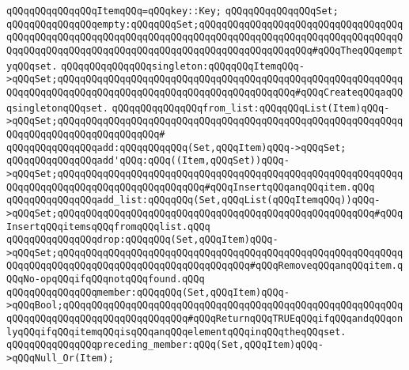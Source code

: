 \newline
\verb|qQQqqQQqqQQqqQQqItemqQQq=qQQqkey::Key;|\newline
\verb|qQQqqQQqqQQqqQQqSet;|\newline
\newline
\verb|qQQqqQQqqQQqqQQqempty:qQQqqQQqSet;qQQqqQQqqQQqqQQqqQQqqQQqqQQqqQQqqQQqqQQqqQQqqQQqqQQqqQQqqQQqqQQqqQQqqQQqqQQqqQQqqQQqqQQqqQQqqQQqqQQqqQQqqQQqqQQqqQQqqQQqqQQqqQQqqQQqqQQqqQQqqQQqqQQqqQQqqQQqqQQq#qQQqTheqQQqemptyqQQqset.|\newline
\newline
\verb|qQQqqQQqqQQqqQQqsingleton:qQQqqQQqItemqQQq->qQQqSet;qQQqqQQqqQQqqQQqqQQqqQQqqQQqqQQqqQQqqQQqqQQqqQQqqQQqqQQqqQQqqQQqqQQqqQQqqQQqqQQqqQQqqQQqqQQqqQQqqQQqqQQqqQQqqQQq#qQQqCreateqQQqaqQQqsingletonqQQqset.|\newline
\newline
\verb|qQQqqQQqqQQqqQQqfrom_list:qQQqqQQqList(Item)qQQq->qQQqSet;qQQqqQQqqQQqqQQqqQQqqQQqqQQqqQQqqQQqqQQqqQQqqQQqqQQqqQQqqQQqqQQqqQQqqQQqqQQqqQQqqQQqqQQq#|\newline
\newline
\verb|qQQqqQQqqQQqqQQqadd:qQQqqQQqqQQq(Set,qQQqItem)qQQq->qQQqSet;|\newline
\verb|qQQqqQQqqQQqqQQqadd'qQQq:qQQq((Item,qQQqSet))qQQq->qQQqSet;qQQqqQQqqQQqqQQqqQQqqQQqqQQqqQQqqQQqqQQqqQQqqQQqqQQqqQQqqQQqqQQqqQQqqQQqqQQqqQQqqQQqqQQqqQQqqQQq#qQQqInsertqQQqanqQQqitem.qQQq|\newline
\newline
\verb|qQQqqQQqqQQqqQQqadd_list:qQQqqQQq(Set,qQQqList(qQQqItemqQQq))qQQq->qQQqSet;qQQqqQQqqQQqqQQqqQQqqQQqqQQqqQQqqQQqqQQqqQQqqQQqqQQqqQQq#qQQqInsertqQQqitemsqQQqfromqQQqlist.qQQq|\newline
\newline
\verb|qQQqqQQqqQQqqQQqdrop:qQQqqQQq(Set,qQQqItem)qQQq->qQQqSet;qQQqqQQqqQQqqQQqqQQqqQQqqQQqqQQqqQQqqQQqqQQqqQQqqQQqqQQqqQQqqQQqqQQqqQQqqQQqqQQqqQQqqQQqqQQqqQQqqQQqqQQq#qQQqRemoveqQQqanqQQqitem.qQQqNo-opqQQqifqQQqnotqQQqfound.qQQq|\newline
\newline
\verb|qQQqqQQqqQQqqQQqmember:qQQqqQQq(Set,qQQqItem)qQQq->qQQqBool;qQQqqQQqqQQqqQQqqQQqqQQqqQQqqQQqqQQqqQQqqQQqqQQqqQQqqQQqqQQqqQQqqQQqqQQqqQQqqQQqqQQqqQQqqQQq#qQQqReturnqQQqTRUEqQQqifqQQqandqQQqonlyqQQqifqQQqitemqQQqisqQQqanqQQqelementqQQqinqQQqtheqQQqset.|\newline
\newline
\verb|qQQqqQQqqQQqqQQqpreceding_member:qQQq(Set,qQQqItem)qQQq->qQQqNull_Or(Item);|\newline
